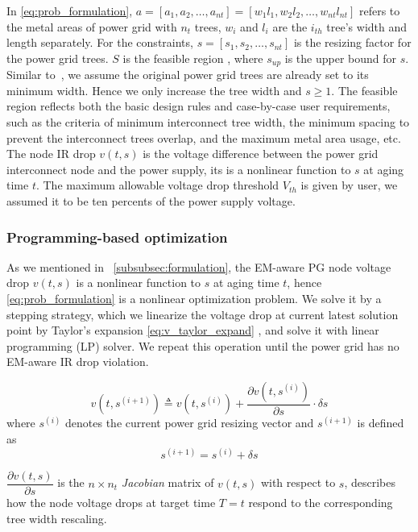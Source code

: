 In \eqref{eq:prob_formulation}, $a=[a_{1},a_{2},\ldots,a_{nt}] = [w_{1}l_{1},w_{2}l_{2},\ldots,w_{nt}l_{nt}]$ refers to the metal areas of power grid with $n_{t}$ trees, $w_{i}$ and $l_{i}$ are the $i_{th}$ tree's width and length separately.
For the constraints, $s=[s_{1},s_{2},\ldots,s_{nt}]$  is the resizing factor for the power grid trees. $S$ is the feasible region ,
where $s_{up}$ is the upper bound for $s$. Similar to~\cite{Sukharev:2019pg}, we assume the original power grid trees are already set to its minimum width. Hence we only increase the tree width and $s \geq 1 $.
The feasible region reflects both the basic design rules and case-by-case user requirements, such as the criteria of minimum interconnect tree width, the minimum spacing to prevent the  interconnect trees overlap, and the maximum metal area usage, etc. 
The node IR drop $v(t,s)$  is the voltage difference between the power grid interconnect node and the power supply, its is a nonlinear function to $s$ at aging time $t$. The maximum allowable voltage drop threshold $V_{th}$ is given by user, we assumed it to be ten percents of the power supply voltage.


\subsubsection{Programming-based optimization}
\label{subsubsec:slp_framework}

As we mentioned in ~\ref{subsubsec:formulation}, the EM-aware PG node voltage drop $v(t,s)$ is a nonlinear function to $s$ at aging time $t$, hence \eqref{eq:prob_formulation} is a nonlinear optimization problem. 
We solve it by a stepping strategy, which we linearize the voltage drop at current latest solution point by Taylor's expansion \eqref{eq:v_taylor_expand} , and solve it with linear programming (LP) solver. We repeat this operation until the power grid has no EM-aware IR drop violation.

\begin{equation}
	\label{eq:v_taylor_expand}
	v(t, s^{(i+1)}) \triangleq v(t,s^{(i)}) + \dfrac{\partial v(t, s^{(i)})}{\partial s} \cdot \delta s
\end{equation}
where $s^{(i)}$ denotes the current power grid resizing vector and $s^{(i+1)}$ is defined as 
\begin{equation}
	\label{eq:s}
	s^{(i+1)} = s^{(i)} + \delta s 
\end{equation}

$ \dfrac{\partial v(t, s)}{\partial s}$ is the $n\times n_{t}$ \textit{Jacobian} matrix of $v(t,s)$ with respect to $s$, describes how the node voltage drops at target time $T=t$ respond to the corresponding tree width rescaling.

